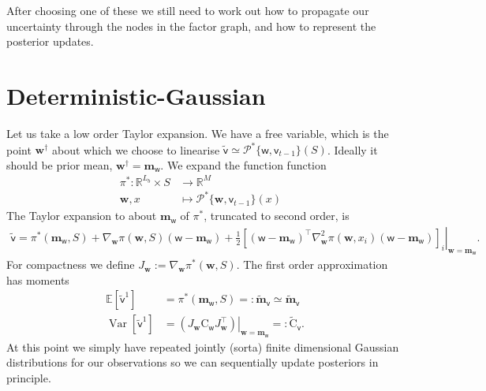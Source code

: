 \documentclass{article}
\newcommand{\var}{\operatorname{Var}}
\newcommand{\vv}[1]{\boldsymbol{#1}}
\newcommand{\mm}[1]{\mathrm{#1}}
\newcommand{\rv}[1]{\mathsf{#1}}
\newcommand{\vrv}[1]{\vv{\rv{#1}}}
\newcommand{\set}[1]{#1}
\newcommand{\op}[1]{\mathscr{#1}}
\newcommand{\Ex}{\mathbb{E}}
\newcommand{\latwt}{\vrv{w}}
\newcommand{\latwtst}{\vv{w}}
\begin{document}
After choosing one of these we still need to work out how to propagate our uncertainty through the nodes in the factor graph, and how to represent the posterior updates.

\section{Deterministic-Gaussian}

Let us take a low order Taylor expansion.
We have a free variable, which is the point \(\vv{w}^\dagger\) about which we choose to linearise \(\tilde{\vrv{v}}\simeq \op{P}^*\{\latwt,\rv{v}_{t-1}\}(\set{S})\).
Ideally it should be prior mean, \(\vv{w}^\dagger=\vv{m}_{\latwt}\).
We expand the function
function \begin{align*}
\pi^*:\mathbb{R}^{L_b}\times\set{S}&\to\mathbb{R}^{M}&\\
\latwtst,x &\mapsto \op{P}^*\{\latwtst,\rv{v}_{t-1}\}(x)&
\end{align*}
The Taylor expansion to about \(\vv{m}_{\latwt}\) of \(\pi^*\), truncated to second order, is
\begin{align*}
    \tilde{\vrv{v}}=\left. \pi^*(\vv{m}_{\latwt},\set{S}) +\nabla_{\latwtst} \pi(\latwtst, \set{S})(\latwt-\vv{m}_{\latwt})+\frac12\left[
        (\latwt-\vv{m}_{\latwt})^\top\nabla^2_{\latwtst}\pi(\latwtst,x_i)(\latwt-\vv{m}_{\latwt})
    \right]_{i} \right|_{\latwtst=\vv{m}_{\latwt}}.
\end{align*}
For compactness we define \(J_{\latwtst}:=\nabla_{\latwtst} \pi^*(\latwtst,\set{S}).\)
The first order approximation has moments
\begin{align*}
    \Ex[\tilde{\vrv{v}}^1] &=
    \pi^*(\vv{m}_{\latwt},\set{S})=:\tilde{\vv{m}}_{\vrv{v}}\simeq \tilde{\vv{m}}_{\vrv{v}}\\
    \var[\tilde{\vrv{v}}^1] &= \left.\left(J_{\latwtst}\mm{C}_{\latwt} J_{\latwtst}^\top\right)\right|_{\latwtst=\vv{m}_{\latwt}}=:\tilde{\mm{C}}_{\vrv{v}}.
\end{align*}
At this point we simply have repeated jointly (sorta) finite dimensional Gaussian distributions for our observations so we can sequentially update posteriors in principle.
\end{document}

